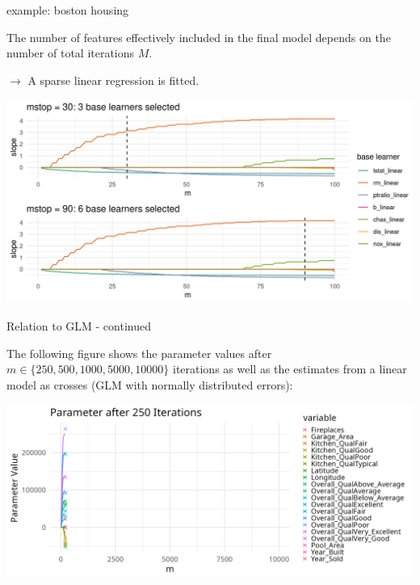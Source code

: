 \documentclass[11pt,compress,t,notes=noshow, xcolor=table]{beamer}
\begin{document}
\begin{vbframe}{example: boston housing}
\framebreak


The number of features effectively included in the final model depends on the
number of total iterations $M$.

\vfill

$\rightarrow$ A sparse linear regression is fitted.

\vfill

\includegraphics[width = \textwidth]{figure/compboost-illustration-2.png}

\end{vbframe}



\begin{vbframe}{Relation to GLM - continued}

The following figure shows the parameter values after $m \in \{250, 500, 1000, 5000, 10000\}$ iterations as well as the estimates from a linear model as crosses (GLM with normally distributed errors):

\begin{center}
\includegraphics[width=\textwidth]{figure/compboost-to-glm-iter250.png}
\end{center}

\end{vbframe}
\end{document}
